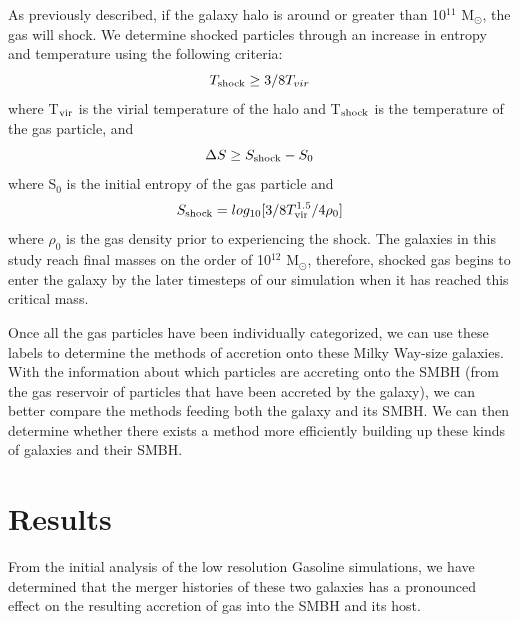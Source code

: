 \documentclass[manuscript]{aastex}
\begin{document}
As previously described, if the galaxy halo is around or greater than 10$^{11}$ M$_{\odot} $, the gas will shock. We determine shocked particles through an increase in entropy and temperature using the following criteria:
\begin{equation}
T_{\rm shock} \geq 3/8 T_{vir}
\end{equation}
where T$_{\rm vir}$ is the virial temperature of the halo and T$_{\rm shock}$ is the temperature of the gas particle, and 
\begin{equation}
\Delta S \geq S_{\rm shock} - S_0
\end{equation}
where S$_0$ is the initial entropy of the gas particle and 
\begin{equation}
S_{\rm shock} = log_{10}[3/8 T_{\rm vir}^{1.5}/4 \rho_0]
\end{equation}
where $\rho_0$ is the gas density prior to experiencing the shock. The galaxies in this study reach final masses on the order of 10$^{12}$ M$_{\odot} $, therefore, shocked gas begins to enter the galaxy by the later timesteps of our simulation when it has reached this critical mass. 


Once all the gas particles have been individually categorized, we can use these labels to determine the methods of accretion onto these Milky Way-size galaxies. With the information about which particles are accreting onto the SMBH (from the gas reservoir of particles that have been accreted by the galaxy), we can better compare the methods feeding both the galaxy and its SMBH. We can then determine whether there exists a method more efficiently building up these kinds of galaxies and their SMBH.

\section{Results} \label{results}

From the initial analysis of the low resolution Gasoline simulations, we have determined that the merger histories of these two galaxies has a pronounced effect on the resulting accretion of gas into the SMBH and its host. 
\end{document}
